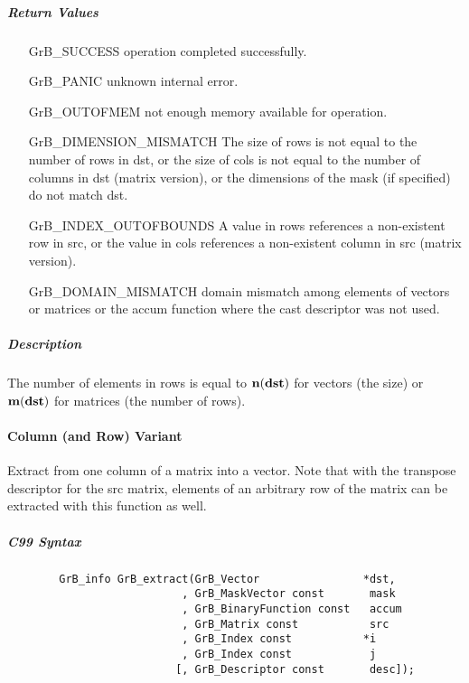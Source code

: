 \subparagraph{Return Values}


\begin{itemize}[leftmargin=2.1in]
\item[{\sf GrB\_SUCCESS}]     operation completed successfully.
\item[{\sf GrB\_PANIC}]        unknown internal error.
\item[{\sf GrB\_OUTOFMEM}]    not enough memory available for operation.
\item[{\sf GrB\_DIMENSION\_MISMATCH}] 
        The size of rows is not equal to the number of rows in dst, or
        the size of cols is not equal to the number of columns in dst (matrix version), or
        the dimensions of the mask (if specified) do not match dst.
\item[{\sf GrB\_INDEX\_OUTOFBOUNDS}]
        A value in rows references a non-existent row in src, or
        the value in cols references a non-existent column in src (matrix version).
\item[\sf GrB\_DOMAIN\_MISMATCH]  
       domain mismatch among elements of vectors or matrices or the accum function where the cast descriptor was not used.
\end{itemize}


\subparagraph{Description}

The number of elements in {\sf rows} is equal to $\bold{n}({\bf dst})$ for 
vectors (the size) or $\bold{m}({\bf dst})$ for matrices (the number of rows).


\paragraph{Column (and Row) Variant}

Extract from one column of a matrix into a vector.  Note that with the transpose
descriptor for the {\sf src} matrix, elements of an arbitrary row of the matrix
can be extracted with this function as well.

\subparagraph{C99 Syntax}

\begin{verbatim}
        GrB_info GrB_extract(GrB_Vector                *dst,
                           , GrB_MaskVector const       mask
                           , GrB_BinaryFunction const   accum
                           , GrB_Matrix const           src
                           , GrB_Index const           *i
                           , GrB_Index const            j
                          [, GrB_Descriptor const       desc]); 
\end{verbatim}

